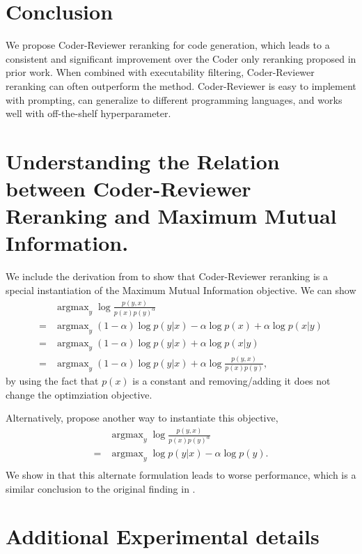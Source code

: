 \documentclass[nohyperref]{article}
\theoremstyle{plain}
\theoremstyle{definition}
\theoremstyle{remark}
\begin{document}
 \section{Conclusion}
We propose Coder-Reviewer reranking for code generation, which leads to a consistent and significant improvement over the Coder only reranking proposed in prior work.
When combined with executability filtering, Coder-Reviewer reranking can often outperform the \mbr{} method.
Coder-Reviewer is easy to implement with prompting, can generalize to different programming languages, and works well with off-the-shelf hyperparameter. 




\appendix
\section{Understanding the Relation between Coder-Reviewer
Reranking and Maximum Mutual Information.}
\label{sec:app-derivation}
We include the derivation from \citet{mmi-diversity} to show that Coder-Reviewer reranking is a special instantiation of the Maximum Mutual Information objective.
We can show
\begin{align*}
    & \text{argmax}_{y}\; \log \frac{p(y, x)}{p(x)p(y)^{\alpha}}\\
    =\; &\text{argmax}_{y}\;(1-\alpha)\log p(y|x) -\alpha\log p(x) + \alpha \log p(x|y)  \\
    =\; &\text{argmax}_{y}\;(1-\alpha)\log p(y|x) + \alpha \log p(x|y)  \\
    =\; &\text{argmax}_{y}\; (1-\alpha)\log p(y|x) + \alpha \log \frac{p(y, x)}{p(x)p(y)},
\end{align*}
by using the fact that $p(x)$ is a constant and removing/adding it does not change the optimziation objective.
\label{sec:app-derivation}

Alternatively, \citet{mmi-diversity} propose another way to instantiate this objective,
\begin{align*}
    & \text{argmax}_{y}\; \log \frac{p(y, x)}{p(x)p(y)^{\alpha}}\\
    =\; &\text{argmax}_{y}\;\log p(y|x) -\alpha\log p(y).  \\
\end{align*}
We show in  that this alternate formulation leads to worse performance, which is a similar conclusion to the original finding in \citet{mmi-diversity}. \section{Additional Experimental details}
\end{document}
